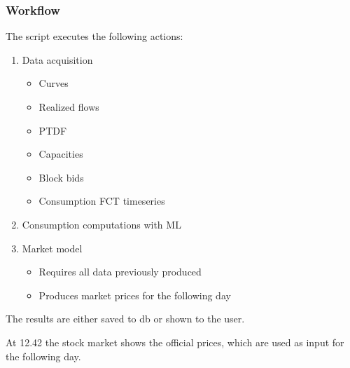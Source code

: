     \subsubsection{Workflow}
    The script executes the following actions:
    \begin{enumerate}
        \item Data acquisition
        \begin{itemize}
            \item Curves
            \item Realized flows
            \item PTDF
            \item Capacities
            \item Block bids
            \item Consumption FCT timeseries
        \end{itemize}
        
        \item Consumption computations with ML
        
        \item Market model
        \begin{itemize}
            \item Requires all data previously produced
            \item Produces market prices for the following day
        \end{itemize}
    \end{enumerate}
    
    The results are either saved to db or shown to the user.
    
    At 12.42 the stock market shows the official prices, which are used as input for the following day.